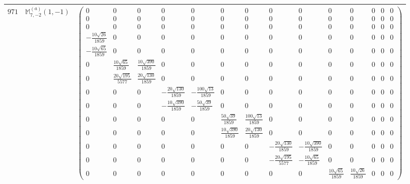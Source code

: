 \documentclass[fleqn,8pt,landscape]{jsarticle}
\begin{document}
\begin{center}
\begin{longtable}{ccc}
$ 971 $ & $ \mathbb{M}_{7,-2}^{(a)}(1,-1) $ & $ \begin{pmatrix} 0 & 0 & 0 & 0 & 0 & 0 & 0 & 0 & 0 & 0 & 0 & 0 & 0 & 0 \\ 0 & 0 & 0 & 0 & 0 & 0 & 0 & 0 & 0 & 0 & 0 & 0 & 0 & 0 \\ 0 & 0 & 0 & 0 & 0 & 0 & 0 & 0 & 0 & 0 & 0 & 0 & 0 & 0 \\ - \frac{10 \sqrt{26}}{1859} & 0 & 0 & 0 & 0 & 0 & 0 & 0 & 0 & 0 & 0 & 0 & 0 & 0 \\ - \frac{10 \sqrt{65}}{1859} & 0 & 0 & 0 & 0 & 0 & 0 & 0 & 0 & 0 & 0 & 0 & 0 & 0 \\ 0 & \frac{10 \sqrt{65}}{1859} & \frac{10 \sqrt{390}}{1859} & 0 & 0 & 0 & 0 & 0 & 0 & 0 & 0 & 0 & 0 & 0 \\ 0 & \frac{20 \sqrt{195}}{5577} & \frac{20 \sqrt{130}}{1859} & 0 & 0 & 0 & 0 & 0 & 0 & 0 & 0 & 0 & 0 & 0 \\ 0 & 0 & 0 & - \frac{20 \sqrt{130}}{1859} & - \frac{100 \sqrt{13}}{1859} & 0 & 0 & 0 & 0 & 0 & 0 & 0 & 0 & 0 \\ 0 & 0 & 0 & - \frac{10 \sqrt{390}}{1859} & - \frac{50 \sqrt{39}}{1859} & 0 & 0 & 0 & 0 & 0 & 0 & 0 & 0 & 0 \\ 0 & 0 & 0 & 0 & 0 & \frac{50 \sqrt{39}}{1859} & \frac{100 \sqrt{13}}{1859} & 0 & 0 & 0 & 0 & 0 & 0 & 0 \\ 0 & 0 & 0 & 0 & 0 & \frac{10 \sqrt{390}}{1859} & \frac{20 \sqrt{130}}{1859} & 0 & 0 & 0 & 0 & 0 & 0 & 0 \\ 0 & 0 & 0 & 0 & 0 & 0 & 0 & - \frac{20 \sqrt{130}}{1859} & - \frac{10 \sqrt{390}}{1859} & 0 & 0 & 0 & 0 & 0 \\ 0 & 0 & 0 & 0 & 0 & 0 & 0 & - \frac{20 \sqrt{195}}{5577} & - \frac{10 \sqrt{65}}{1859} & 0 & 0 & 0 & 0 & 0 \\ 0 & 0 & 0 & 0 & 0 & 0 & 0 & 0 & 0 & \frac{10 \sqrt{65}}{1859} & \frac{10 \sqrt{26}}{1859} & 0 & 0 & 0 \end{pmatrix} $ \\ \hline

\end{longtable}
\end{center}
\end{document}
